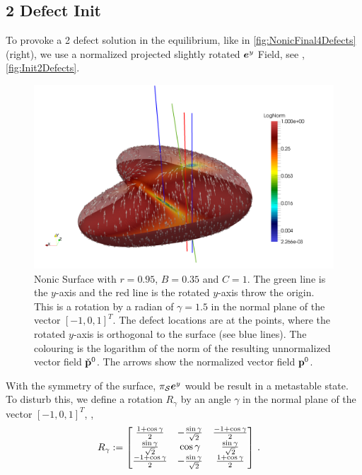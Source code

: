 \documentclass[a4paper,11pt]{scrartcl}
\newcommand{\EuBase}[1]{\eb^{#1}}
\newcommand{\pstretch}{C}
\newcommand{\pprop}{r}
\newcommand{\ppress}{B}
\begin{document}
\subsection{2 Defect Init}
To provoke a 2 defect solution in the equilibrium, like in \autoref{fig:NonicFinal4Defects} (right), 
we use a normalized projected slightly rotated \( \EuBase{y} \) Field, see \eg, \autoref{fig:Init2Defects}.
\begin{figure}
  \centering
  \includegraphics[width=.95\textwidth]{stuff/paraview/Init2Defects.png}
  \caption{Nonic Surface with \( \pprop = 0.95 \), \( \ppress = 0.35 \) and \( \pstretch = 1 \). 
           The green line is the \( y \)-axis and the red line is the rotated \( y \)-axis throw the origin.
           This is a rotation by a radian of \( \gamma = 1.5 \) in the normal plane of the vector 
           \( [-1,0,1]^{T} \).
           The defect locations are at the points, where the rotated \( y \)-axis is orthogonal to the surface (see blue lines).
           The colouring is the logarithm of the norm of the resulting unnormalized vector field \(\check{\mathbf{p}}^{0}\).
           The arrows show the normalized vector field \(\mathbf{p}^{0}\).
           }
  \label{fig:Init2Defects}
\end{figure}
With the symmetry of the surface, \( \ProjectSurf\EuBase{y} \) would be result in a metastable state.
To disturb this, we define a rotation \( R_{\gamma}  \) by an angle \( \gamma \) in the normal plane of the vector \( [-1,0,1]^{T} \),
\ie,
\begin{align}
    R_{\gamma} &:=
      \begin{bmatrix}
        \frac{1+\cos\gamma}{2}      & -\frac{\sin\gamma}{\sqrt{2}}  & \frac{-1+\cos\gamma}{2} \\
        \frac{\sin\gamma}{\sqrt{2}} & \cos\gamma                    & \frac{\sin\gamma}{\sqrt{2}} \\
        \frac{-1+\cos\gamma}{2}     & -\frac{\sin\gamma}{\sqrt{2}}  & \frac{1+\cos\gamma}{2}
      \end{bmatrix} \,\text{.}
\end{align}
\end{document}
